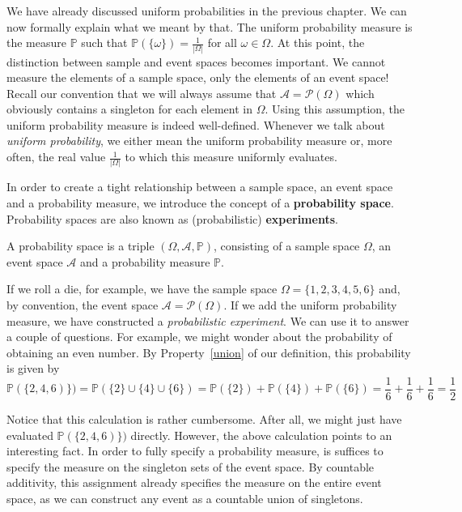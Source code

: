 \documentclass[a4paper,11pt,leqno]{report}
\begin{document}
We have already discussed uniform probabilities in the previous chapter. We can now formally explain
what we meant by that. The uniform probability measure is the measure $ \mathbb{P} $ such that
$ \mathbb{P}(\{\omega\}) = \frac{1}{|\Omega|} $ for all $ \omega \in \Omega $. At this point, the
distinction between sample and event spaces becomes important. We cannot measure the elements of a
sample space, only the elements of an event space! Recall our convention that we will always assume
that $ \mathcal{A} = \mathcal{P}(\Omega) $ which obviously contains a singleton for each element in
$ \Omega $. Using this assumption, the uniform probability measure is indeed well-defined. Whenever we talk about
\textit{uniform probability}, we either mean the uniform probability measure or, more often, the real
value $ \frac{1}{|\Omega|} $ to which this measure uniformly evaluates.

In order to create a tight relationship between a sample space, an event space and a probability measure,
we introduce the concept of a \textbf{probability space}. Probability spaces are also known as 
(probabilistic) \textbf{experiments}.

\begin{Definition} \label{def:ProbabilitySpace}
A probability space is a triple $ (\Omega, \mathcal{A}, \mathbb{P}) $, consisting of a sample space $ \Omega $,
an event space $ \mathcal{A} $ and a probability measure $ \mathbb{P} $.
\end{Definition}

If we roll a die, for example, we have the sample space $ \Omega = \{1,2,3,4,5,6\} $ and, by 
convention, the event space $ \mathcal{A} = \mathcal{P}(\Omega) $. If we add the uniform probability measure, 
we have constructed  a \emph{probabilistic experiment}. We can use it to answer a couple of questions. For example, we 
might wonder about the probability of obtaining an even number. By Property~\ref{union} of our definition, this 
probability is given by
\begin{equation}
\mathbb{P}(\{2,4,6)\}) = \mathbb{P}(\{2\} \cup \{4\} \cup \{6\}) = \mathbb{P}(\{2
\}) + \mathbb{P}(\{4\})
+ \mathbb{P}(\{6\}) = \frac{1}{6} + \frac{1}{6} + \frac{1}{6} = \frac{1}{2}
\end{equation}

Notice that this calculation is rather cumbersome. After all, we might just have evaluated 
$ \mathbb{P}(\{2,4,6)\}) $ directly. However, the above calculation points to an interesting fact. In order
to fully specify a probability measure, is suffices to specify the measure on the singleton sets of the
event space. By countable additivity, this assignment already specifies the measure on the entire event space, as we can
construct any event as a countable union of singletons.
\end{document}
